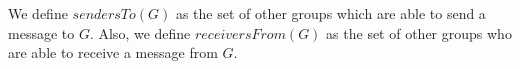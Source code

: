 \documentclass[times, 10pt]{article}
\begin{document}
We define $sendersTo(G)$ as the set of other groups which are able to send a message to $G$. Also, we define $receiversFrom(G)$ as the set of other groups who are able to receive a message from $G$.




\end{document}
